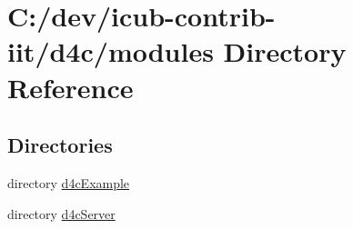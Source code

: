 \section{C\+:/dev/icub-\/contrib-\/iit/d4c/modules Directory Reference}
\label{dir_e05d7e2b1ecd646af5bb94391405f3b5}
\subsection*{Directories}
\begin{DoxyCompactItemize}
\item 
directory \hyperlink{dir_adae1137afda38b4ce421daebc84375a}{d4c\+Example}
\item 
directory \hyperlink{dir_6da782a0f1d54235d451d380222fd43d}{d4c\+Server}
\end{DoxyCompactItemize}
